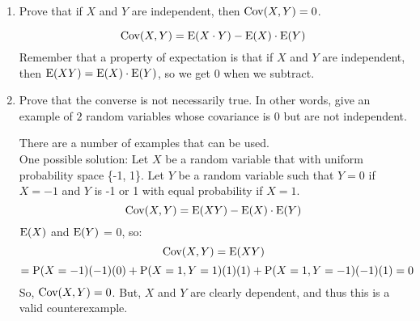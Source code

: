 \question 
\begin{enumerate}[label=(\alph*)]
\item Prove that if $X$ and $Y$ are independent, then $\cov(X, Y) = 0$.
\begin{solution}[.5cm]
	\[\cov(X, Y) = \E(X \cdot Y) - \E(X) \cdot \E(Y)\]
Remember that a property of expectation is that if $X$ and $Y$ are 
independent, then $\E(XY) = \E(X) \cdot \E(Y)$, so we get 0 when we subtract. 
\end{solution}
\item Prove that the converse is not necessarily true. In other words, give an example of $2$ random variables whose covariance is $0$ but are not independent.
\begin{solution}[.75cm]
There are a number of examples that can be used. \\
One possible solution: Let $X$ be a random variable that with uniform probability space \{-1, 1\}. Let $Y$ be a random variable such that $Y = 0$ if $X = -1$ and $Y$ is -1 or 1 with equal probability if $X = 1$. \\
\[\cov(X, Y) = \E(XY) - \E(X) \cdot \E(Y)\]
$\E(X)$ and $\E(Y)$ = 0, so: 
\[\cov(X, Y) = \E(XY)\]
\[= \P(X=-1)(-1)(0) + \P(X=1, Y=1)(1)(1) + \P(X=1, Y=-1)(-1)(1) = 0\]
So, $\cov(X, Y) = 0$. But, $X$ and $Y$ are clearly dependent, and thus this is a valid counterexample. 

	\begin{comment}
	Let $X \mathtt{\sim} U(-1, 1)$ and let $Y = X^2$ \newline
	
	We have $E[X] = \frac{-1+1}{2} = 0$ \newline
	The pdf of $X$ is $\frac{1}{2}$, so \newline 
	$E[Y] = E[X^2] = \int\limits_{-1}^{1}x^2f_X(x) dx = \int\limits_{-1}^{1}\frac{1}{2}x^2 = \frac{1}{3}$ \newline
	We also have $E[XY] = E[X * X^2] = E[X^3] = \int\limits_{-1}^{1}x^3f_X(x) dx
	=  \int\limits_{-1}^{1}\frac{1}{2}x^3 dx  = 0$ \newline
	cov$(X, Y) = E[XY] - E[X]E[Y] = 0 - 0 * \frac{1}{3} = 0$ \newline
	However, $Y$ is clearly dependent on $X$ as $Y = X^2$, and thus we provide a valid counterexample. 
	\end{comment}
\end{solution}
\end{enumerate}